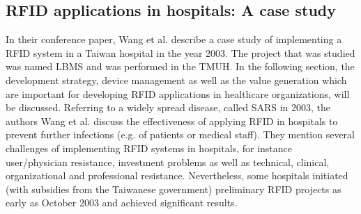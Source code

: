 \subsection{RFID applications in hospitals: A case study}

In their conference paper, Wang et al. \cite{casestudy} describe a case study of implementing a RFID system in a Taiwan hospital in the year 2003. The project that was studied was named \ac{LBMS} and was performed in the \ac{TMUH}. In the following section, the development strategy, device management as well as the value generation which are important for developing RFID applications in healthcare organizations, will be discussed. 
Referring to a widely spread disease, called \ac{SARS} in 2003, the authors Wang et al. discuss the effectiveness of applying RFID in hospitals to prevent further infections (e.g. of patients or medical staff). They mention several challenges of implementing RFID systems in hospitals, for instance user/physician resistance, investment problems as well as technical, clinical, organizational and professional resistance. Nevertheless, some hospitals initiated (with subsidies from the Taiwanese government) preliminary RFID projects as early as October 2003 and achieved significant results. 

